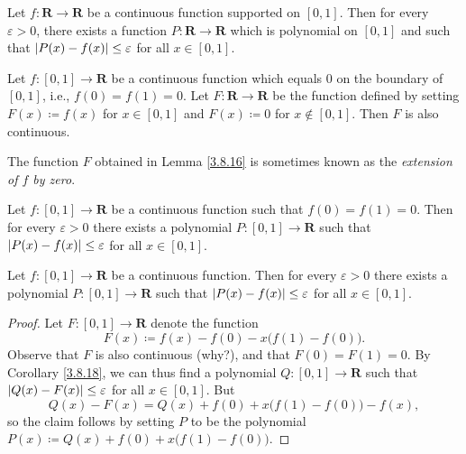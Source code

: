 \begin{corollary}\label{3.8.15}
    Let \(f : \mathbf{R} \to \mathbf{R}\) be a continuous function supported on \([0, 1]\).
    Then for every \(\varepsilon > 0\), there exists a function \(P : \mathbf{R} \to \mathbf{R}\) which is polynomial on \([0, 1]\) and such that \(\abs*{P(x) - f(x)} \leq \varepsilon\) for all \(x \in [0, 1]\).
\end{corollary}

\begin{lemma}\label{3.8.16}
    Let \(f : [0, 1] \to \mathbf{R}\) be a continuous function which equals \(0\) on the boundary of \([0, 1]\), i.e., \(f(0) = f(1) = 0\).
    Let \(F : \mathbf{R} \to \mathbf{R}\) be the function defined by setting \(F(x) \coloneqq f(x)\) for \(x \in [0, 1]\) and \(F(x) \coloneqq 0\) for \(x \notin [0, 1]\).
    Then \(F\) is also continuous.
\end{lemma}

\begin{remark}\label{3.8.17}
    The function \(F\) obtained in Lemma \ref{3.8.16} is sometimes known as the \emph{extension of \(f\) by zero}.
\end{remark}

\begin{corollary}\label{3.8.18}
    Let \(f : [0, 1] \to \mathbf{R}\) be a continuous function such that \(f(0) = f(1) = 0\).
    Then for every \(\varepsilon > 0\) there exists a polynomial \(P : [0, 1] \to \mathbf{R}\) such that \(\abs*{P(x) - f(x)} \leq \varepsilon\) for all \(x \in [0, 1]\).
\end{corollary}

\begin{corollary}\label{3.8.19}
    Let \(f : [0, 1] \to \mathbf{R}\) be a continuous function.
    Then for every \(\varepsilon > 0\) there exists a polynomial \(P : [0, 1] \to \mathbf{R}\) such that \(\abs*{P(x) - f(x)} \leq \varepsilon\) for all \(x \in [0, 1]\).
\end{corollary}

\begin{proof}
    Let \(F : [0, 1] \to \mathbf{R}\) denote the function
    \[
        F(x) \coloneqq f(x) - f(0) - x \big(f(1) - f(0)\big).
    \]
    Observe that \(F\) is also continuous (why?), and that \(F(0) = F(1) = 0\).
    By Corollary \ref{3.8.18}, we can thus find a polynomial \(Q : [0, 1] \to \mathbf{R}\) such that \(\abs*{Q(x) - F(x)} \leq \varepsilon\) for all \(x \in [0, 1]\).
    But
    \[
        Q(x) - F(x) = Q(x) + f(0) + x \big(f(1) - f(0)\big) - f(x),
    \]
    so the claim follows by setting \(P\) to be the polynomial \(P(x) \coloneqq Q(x) + f(0) + x \big(f(1) - f(0)\big)\).
\end{proof}

